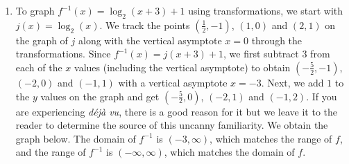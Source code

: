 {\begin{enumerate}
\begin{enumerate}
\item subtract $3$

\end{enumerate}

Clearly, to undo subtracting $1$, we will add $1$, and similarly we undo subtracting $3$ by adding $3$.  How do we undo the second step?  The answer is we use the logarithm.  By definition, $\log_{2}(x)$ undoes exponentiation by $2$.  Hence, $f^{-1}$ should

\begin{enumerate}

\item add $3$

\item take the logarithm base $2$

\item add $1$

\end{enumerate}

In symbols, $f^{-1}(x) = \log_{2}(x+3)+1$.  


\item  To graph $f^{-1}(x) = \log_{2}(x+3)+1$ using transformations, we start with $j(x) = \log_{2}(x)$.  We track the points $\left(\frac{1}{2},-1\right)$, $(1,0)$ and $(2, 1)$ on the graph of $j$ along with the vertical asymptote $x=0$ through the transformations.  Since $f^{-1}(x) = j(x+3)+1$, we first subtract $3$ from each of the $x$ values (including the vertical asymptote) to obtain  $\left(-\frac{5}{2},-1\right)$, $(-2,0)$ and $(-1, 1)$ with a vertical asymptote $x = -3$.  Next, we add $1$ to the $y$ values on the graph and get $\left(-\frac{5}{2},0\right)$, $(-2,1)$ and $(-1, 2)$.  If you are experiencing \textit{d\'{e}j\`{a} vu}, there is a good reason for it but we leave it to the reader to determine the source of this uncanny familiarity.  We obtain the graph below.  The domain of $f^{-1}$ is $(-3, \infty)$, which matches the range of $f$, and the range of $f^{-1}$ is $(-\infty, \infty)$, which matches the domain of $f$.




\end{enumerate}}
